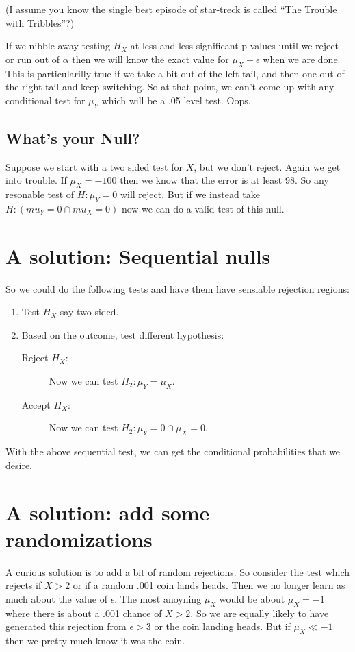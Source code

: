 \documentclass[14pt]{extarticle}
\begin{document}
(I assume you know the single best episode of star-treck is called 
``The Trouble with Tribbles''?)

If we nibble away testing $H_X$ at less and less significant p-values
until we reject or run out of $\alpha$ then we will know the exact
value for $\mu_X + \epsilon$ when we are done.  This is particularilly
true if we take a bit out of the left tail, and then one out of the
right tail and keep switching.  So at that point, we can't come up
with any conditional test for $\mu_Y$ which will be a .05 level test.
Oops.

\subsection{What's your Null?}

Suppose we start with a two sided test for $X$, but we don't reject.
Again we get into trouble.  If $\mu_X = -100$ then we know that the
error is at least 98.  So any resonable test of $H: \mu_Y = 0$ will
reject.  But if we instead take $H: (mu_Y = 0 \cap mu_X = 0)$ now we
can do a valid test of this null.  

\section{A solution: Sequential nulls}

So we could do the following tests and have them have sensiable
rejection regions:
\begin{enumerate}
\item Test $H_X$ say two sided.
\item Based on the outcome, test different hypothesis:
\begin{description}
\item[Reject $H_X$:] Now we can test $H_2: \mu_Y = \mu_X$.
\item[Accept $H_X$:] Now we can test $H_2: \mu_Y =0 \cap  \mu_X = 0$.
\end{description}
\end{enumerate}
With the above sequential test, we can get the conditional
probabilities that we desire.  


\section{A solution: add some randomizations}

A curious solution is to add a bit of random rejections.  So consider
the test which rejects if $X > 2$ or if a random .001 coin lands
heads.  Then we no longer learn as much about the value of
$\epsilon$.  The most anoyning $\mu_X$ would be about $\mu_X = -1$
where there is about a .001 chance of $X > 2$.  So we are equally
likely to have generated this rejection from $\epsilon > 3$ or the
coin landing heads.  But if $\mu_X \ll -1$ then we pretty much know it
was the coin.
\end{document}
